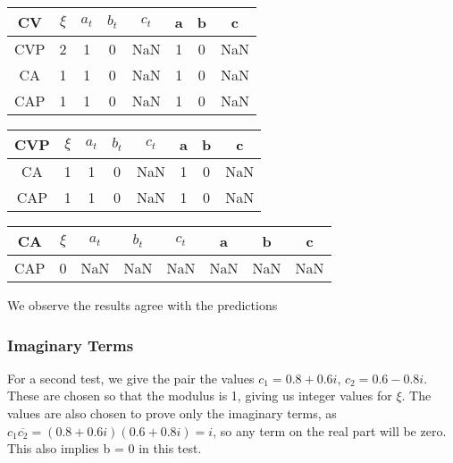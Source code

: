 \documentclass[twocolumn]{article}
\begin{document}
\begin{table}[H]
	\begin{tabular}{|c|c|c|c|c|c|c|c|}
		\hline
		CV & $\xi $& $a_t$ & $b_t$ & $c_t$ & a & b & c \\
		\hline
		CVP &  2 & 1  & 0  & NaN  &  1 & 0  & NaN  \\
		\hline
		CA & 1 & 1  & 0  & NaN  & 1  & 0  & NaN  \\
		\hline
		CAP & 1 & 1  & 0  & NaN  &  1 & 0  & NaN  \\
		\hline
	\end{tabular}
\end{table}


\begin{table}[H]
	\begin{tabular}{|c|c|c|c|c|c|c|c|}
		\hline
		CVP & $\xi $& $a_t$ & $b_t$ & $c_t$ & a & b & c \\
		\hline
		CA & 1 & 1  &  0 & NaN & 1  & 0  &  NaN \\
		\hline
		CAP & 1 & 1  & 0  & NaN  & 1 & 0  &  NaN \\
		\hline
	\end{tabular}
\end{table}

\begin{table}[H]
	\begin{tabular}{|c|c|c|c|c|c|c|c|}
		\hline
		CA & $\xi $& $a_t$ & $b_t$ & $c_t$ & a & b & c \\
		\hline
		CAP & 0 &  NaN &  NaN & NaN   & NaN  &  NaN & NaN    \\
		\hline
	\end{tabular}
\end{table}

We observe the results agree with the predictions

\subsubsection{Imaginary Terms}

For a second test, we give the pair the values $c_1 = 0.8 + 0.6i$, $c_2 = 0.6 - 0.8i$. These are chosen so that the modulus is 1, giving us integer values for $\xi$. The values are also chosen to prove only the imaginary terms, as $c_1\overline{c_2} = (0.8+0.6i)(0.6+0.8i) = i$, so any term on the real part will be zero. This also implies b = 0  in this test.
\end{document}
